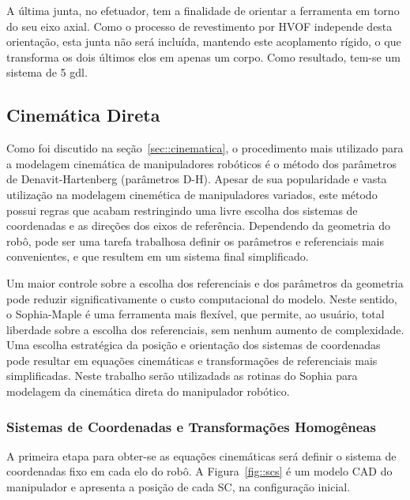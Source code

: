 A última junta, no efetuador, tem a finalidade de orientar a ferramenta em torno
do seu eixo axial. Como o processo de revestimento por HVOF independe desta
orientação, esta junta não será incluída, mantendo este acoplamento rígido, o
que transforma os dois últimos elos em apenas um corpo.
Como resultado, tem-se um sistema de 5 gdl.


\subsection{Cinemática Direta}

Como foi discutido na seção~\ref{sec::cinematica}, o procedimento mais utilizado
para a modelagem cinemática de manipuladores robóticos é o método dos parâmetros
de Denavit-Hartenberg (parâmetros D-H). Apesar de sua popularidade e vasta
utilização na modelagem cinemética de manipuladores variados, este método possui
regras que acabam restringindo uma livre escolha dos sistemas de coordenadas e
as direções dos eixos de referência. Dependendo da geometria do robô, pode ser
uma tarefa trabalhosa definir os parâmetros e referenciais mais convenientes, e
que resultem em um sistema final simplificado.

Um maior controle sobre a escolha dos referenciais e dos parâmetros da geometria
pode reduzir significativamente o custo computacional do modelo.
Neste sentido, o Sophia-Maple é uma ferramenta mais flexível, que permite, ao
usuário, total liberdade sobre a escolha dos referenciais, sem nenhum aumento de
complexidade. Uma escolha estratégica da posição e orientação dos sistemas de
coordenadas pode resultar em equações cinemáticas e transformações de
referenciais mais simplificadas. Neste trabalho serão utilizadads as rotinas do
Sophia para modelagem da cinemática direta do manipulador robótico.

\subsubsection{Sistemas de Coordenadas e Transformações Homogêneas}

A primeira etapa para obter-se as equações cinemáticas será definir o sistema de
coordenadas fixo em cada elo do robô. A Figura~\ref{fig::scs} é um modelo CAD do
manipulador e apresenta a posição de cada SC, na configuração inicial.

